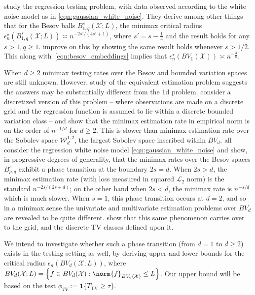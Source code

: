 \documentclass{article}
\newcommand{\set}[1]{\left\{#1\right\}}
\newcommand{\1}{\mathbf{1}}
\theoremstyle{alden}
\theoremstyle{aldenthm}
\theoremstyle{definition}
\theoremstyle{remark}
\begin{document}
\citet{lepski1999} study the regression testing problem, with data observed according to the white noise model as in \eqref{eqn:gaussian_white_noise}. They derive among other things that for the Besov balls $B_{1,q}^s(\mathcal{X}; L)$, the minimax critical radius $\epsilon_n^{\star}(B_{1,q}^s(\mathcal{X}; L)) \asymp n^{-2s'/(4s' + 1)}$, where $s' = s - \frac{1}{4}$ and the result holds for any $s > 1, q \geq 1$. \citet{ingster00} improve on this by showing the same result holds whenever $s > 1/2$. This along with~\eqref{eqn:besov_embeddings} implies that $\epsilon_n^{\star}(BV_1(\mathcal{X})) \asymp n^{-\frac{3}{8}}$. 

When $d \geq 2$ minimax testing rates over the Besov and bounded variation spaces are still unknown. However, study of the equivalent estimation problem suggests the answers may be substantially different from the 1d problem. \citet{sadhanala16} consider a discretized version of this problem -- where observations are made on a discrete grid and the regression function is assumed to lie within a discrete bounded variation class -- and show that the minimax estimation rate in empirical norm is on the order of $n^{-1/d}$ for $d \geq 2$. This is slower than minimax estimation rate over the Sobolev space $\mathcal{W}_d^{1,2}$, the largest Sobolev space inscribed within $BV_d$. \citet{delyon96,kerkyacharian08,lepski2015,ruiz18} all consider the regression white noise model \eqref{eqn:gaussian_white_noise} and show, in progressive degrees of generality, that the minimax rates over the Besov spaces $B_{p,q}^s$ exhibit a phase transition at the boundary $2s = d$. When $2s > d$, the minimax estimation rate (with loss measured in squared $\mathcal{L}_2$ norm) is the standard $n^{-2s/(2s + d)}$; on the other hand when $2s < d$, the minimax rate is $n^{-s/d}$ which is much slower. When $s = 1$, this phase transition occurs at $d = 2$, and so in a minimax sense the univariate and multivariate estimation problems over $BV_d$ are revealed to be quite different. \citet{sadhanala17} show that this same phenomenon carries over to the grid, and the discrete TV classes defined upon it. 

We intend to investigate whether such a phase transition (from $d = 1$ to $d \geq 2$) exists in the testing setting as well, by deriving upper and lower bounds for the critical radius $\epsilon_n(BV_d(\mathcal{X};L))$, where $BV_d(\mathcal{X}; L) = \set{f \in BV_d(\mathcal{X}): \norm{f}_{BV_d(\mathcal{X})} \leq L}$. Our upper bound will be based on the test $\phi_{TV} := \1\{T_{\mathrm{TV}} \geq \tau \}$.
\end{document}
